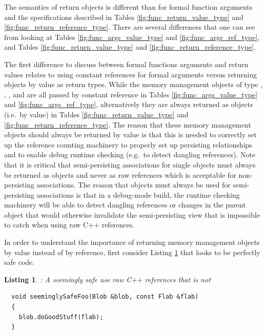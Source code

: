 \documentclass[pdf,ps2pdf,11pt]{SANDreport}
\newtheorem{listing}{Listing}
\begin{document}
The semantics of return objects is different than for formal function
arguments and the specifications described in Tables
{}\ref{fig:func_return_value_type} and
{}\ref{fig:func_return_reference_type}.  There are several differences
that one can see from looking at Tables
{}\ref{fig:func_args_value_type} and {}\ref{fig:func_args_ref_type},
and Tables {}\ref{fig:func_return_value_type} and
{}\ref{fig:func_return_reference_type}.

The first difference to discuss between formal functions arguments and
return values relates to using constant references for formal
arguments versus returning objects by value as return types.  While
the memory management objects of type {}, {},
{}, and {} are all passed by constant
reference in Tables {}\ref{fig:func_args_value_type} and
{}\ref{fig:func_args_ref_type}, alternatively they are always returned
as objects (i.e.\ by value) in Tables
{}\ref{fig:func_return_value_type} and
{}\ref{fig:func_return_reference_type}.  The reason that these memory
management objects should always be returned by value is that this is
needed to correctly set up the reference counting machinery to
properly set up persisting relationships and to enable debug runtime
checking (e.g.\ to detect dangling references).  Note that it is
critical that semi-persisting associations for single objects must
always be returned as {} objects and never as raw
references {} which is acceptable for non-persisting
associations.  The reason that {} objects must always be
used for semi-persisting associations is that in a debug-mode build,
the runtime checking machinery will be able to detect dangling
references or changes in the parent object that would otherwise
invalidate the semi-persisting view that is impossible to catch when
using raw C++ references.

In order to understand the importance of returning memory management
objects by value instead of by reference, first consider Listing
{}\ref{listing:unsafe_raw_C++_reference1} that looks to be perfectly
safe code.

\begin{listing}: A seemingly safe use raw C++ references that is not \\
\label{listing:unsafe_raw_C++_reference1}
{\small\begin{verbatim}
  void seeminglySafeFoo(Blob &blob, const Flab &flab)
  {
    blob.doGoodStuff(flab);
  }
\end{verbatim}}
\end{listing}
\end{document}
